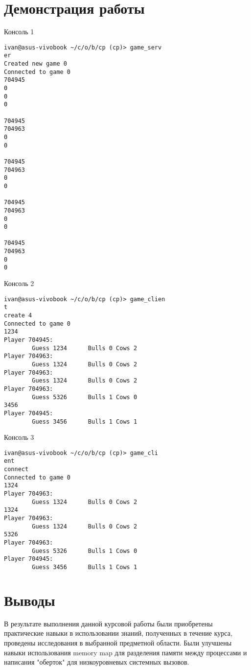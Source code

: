 \documentclass[a4paper, 12pt]{article}
\begin{document}
\newpage
\section{Демонстрация работы}

Консоль 1
\begin{verbatim}
ivan@asus-vivobook ~/c/o/b/cp (cp)> game_serv
er
Created new game 0
Connected to game 0
704945
0
0
0

704945
704963
0
0

704945
704963
0
0

704945
704963
0
0

704945
704963
0
0
\end{verbatim}

Консоль 2
\begin{verbatim}
ivan@asus-vivobook ~/c/o/b/cp (cp)> game_clien
t
create 4
Connected to game 0
1234
Player 704945:
        Guess 1234      Bulls 0 Cows 2
Player 704963:
        Guess 1324      Bulls 0 Cows 2
Player 704963:
        Guess 1324      Bulls 0 Cows 2
Player 704963:
        Guess 5326      Bulls 1 Cows 0
3456
Player 704945:
        Guess 3456      Bulls 1 Cows 1
\end{verbatim}

Консоль 3
\begin{verbatim}
ivan@asus-vivobook ~/c/o/b/cp (cp)> game_cli
ent
connect
Connected to game 0
1324
Player 704963:
        Guess 1324      Bulls 0 Cows 2
1324 
Player 704963:
        Guess 1324      Bulls 0 Cows 2
5326
Player 704963:
        Guess 5326      Bulls 1 Cows 0
Player 704945:
        Guess 3456      Bulls 1 Cows 1
\end{verbatim}

\newpage
\section{Выводы}
В результате выполнения данной курсовой работы были приобретены практические навыки в использовании знаний, полученных
в течение курса, проведены исследования в выбранной предметной области. Были улучшены навыки использования
memory map для разделения памяти между процессами и написания "оберток" для низкоуровневых системных вызовов.
\end{document}
